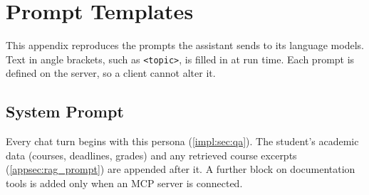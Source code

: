 \chapter{Prompt Templates}
\label{append:prompts}
\vspace*{2em}


This appendix reproduces the prompts the assistant sends to its language
models. Text in angle brackets, such as \texttt{<topic>}, is filled in at run
time. Each prompt is defined on the server, so a client cannot alter it.

\section{System Prompt}
\label{appsec:system_prompt}

Every chat turn begins with this persona (\autoref{impl:sec:qa}). The
student's academic data (courses, deadlines, grades) and any retrieved course
excerpts (\autoref{appsec:rag_prompt}) are appended after it. A further block
on documentation tools is added only when an MCP server is connected.

